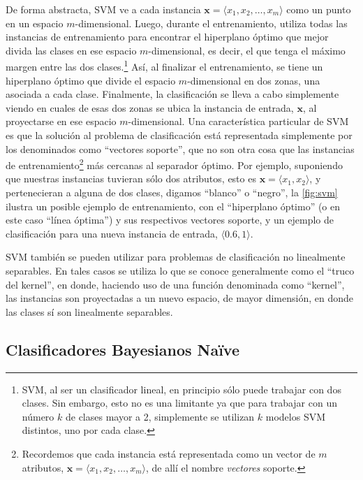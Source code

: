 De forma abstracta, \ac{SVM} ve a cada instancia $\pmb{x}=\langle x_1,x_2,\dots,x_m\rangle$ como un punto en un espacio $m$-dimensional. Luego, durante el entrenamiento, utiliza todas las instancias de entrenamiento para encontrar el hiperplano óptimo que mejor divida las clases en ese espacio $m$-dimensional, es decir, el que tenga el máximo margen entre las dos clases.\footnote{\ac{SVM}, al ser un clasificador lineal, en principio sólo puede trabajar con dos clases. Sin embargo, esto no es una limitante ya que para trabajar con un número $k$ de clases mayor a 2, simplemente se utilizan $k$ modelos \ac{SVM} distintos, uno por cada clase.}
Así, al finalizar el entrenamiento, se tiene un hiperplano óptimo que divide el espacio $m$-dimensional en dos zonas, una asociada a cada clase. Finalmente, la clasificación se lleva a cabo simplemente viendo en cuales de esas dos zonas se ubica la instancia de entrada, $\pmb{x}$, al proyectarse en ese espacio $m$-dimensional.
Una característica particular de \ac{SVM} es que la solución al problema de clasificación está representada simplemente por los denominados como ``vectores soporte'', que no son otra cosa que las instancias de entrenamiento\footnote{Recordemos que cada instancia está representada como un vector de $m$ atributos, $\pmb{x}=\langle x_1,x_2,\dots,x_m\rangle$, de allí el nombre \emph{vectores} soporte.} más cercanas al separador óptimo.
Por ejemplo, suponiendo que nuestras instancias tuvieran sólo dos atributos, esto es $\pmb{x}=\langle x_1,x_2\rangle$, y pertenecieran a alguna de dos clases, digamos ``blanco'' o ``negro'', la \autoref{fig:svm} ilustra un posible ejemplo de entrenamiento, con el ``hiperplano óptimo'' (o en este caso ``línea óptima'') y sus respectivos vectores soporte, y un ejemplo de clasificación para una nueva instancia de entrada, $\langle 0.6, 1\rangle$.

\ac{SVM} también se pueden utilizar para problemas de clasificación no linealmente separables. En tales casos se utiliza lo que se conoce generalmente como el ``truco del kernel''\cite{scholkopf2001kernel}, en donde, haciendo uso de una función denominada como ``kernel'', las instancias son proyectadas a un nuevo espacio, de mayor dimensión, en donde las clases sí son  linealmente separables.


\subsection{Clasificadores Bayesianos Naïve}
\label{sec:mnb}

